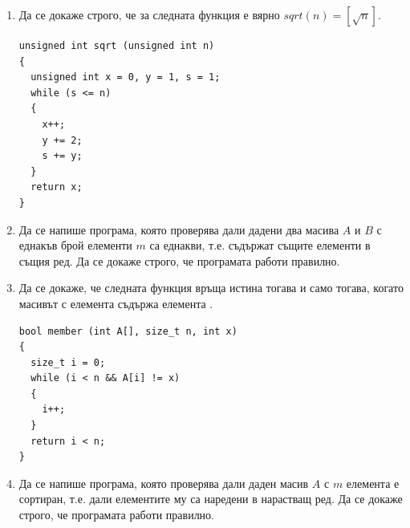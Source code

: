 {\begin{enumerate}[resume]
\begin{enumerate}[label=\alph*)]
    \item
\begin{verbatim}
unsigned int pow (unsigned int x, usnigned int y)
{
  unsigned int p = 1, i = 0;
  while (i < y)
  {
    p *= x;
    i++;
  }
  return p;
}
\end{verbatim}
    \item
\begin{verbatim}
unsigned int pow (unsigned int x, usnigned int y)
{
  unsigned int p = 1;
  while (y > 0)
  {
    p *= x;
    y--;
  }
  return p;
}
\end{verbatim}
      \item
\begin{verbatim}
unsigned int pow (unsigned int x, usnigned int y)
{
  unsigned int z = x, t = y, p = 1;
  while (t > 0)
  {
    if (t%2 == 0)
    {
      z *= z;
      t /= 2;
    }else{
      t = t - 1;
      p *= z;
    }
  }
  return p;
}
\end{verbatim}
  \end{enumerate}

  \item Да се докаже строго, че за следната функция е вярно $sqrt(n)=[\sqrt{n}]$.

\begin{verbatim}
unsigned int sqrt (unsigned int n)
{
  unsigned int x = 0, y = 1, s = 1;
  while (s <= n)
  {
    x++;
    y += 2;
    s += y;
  }
  return x;
}
\end{verbatim}

\item Да се напише програма, която проверява дали дадени два масива $A$ и $B$ с еднакъв брой елементи $m$ са еднакви, т.е. съдържат същите елементи в същия ред. Да се докаже строго, че програмата работи правилно.

\item Да се докаже, че следната функция връща истина тогава и само тогава, когато масивът  с  елемента съдържа елемента .

\begin{verbatim}
bool member (int A[], size_t n, int x)
{
  size_t i = 0;
  while (i < n && A[i] != x)
  {
    i++;
  }
  return i < n;
}
\end{verbatim}

\item Да се напише програма, която проверява дали даден масив $A$ с $m$ елемента е сортиран, т.е. дали елементите му са наредени в нарастващ ред. Да се докаже строго, че програмата работи правилно.


\end{enumerate}}

